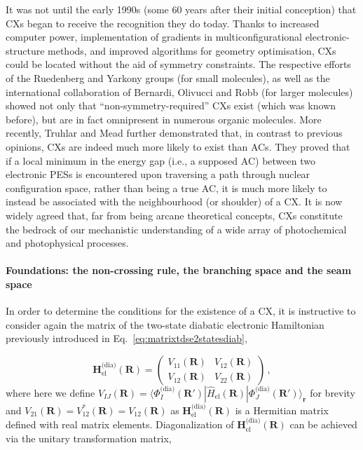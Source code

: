 \documentclass[9pt,bestpractices]{livecoms}
\newcommand{\R}{\mathbf{R}}
\newcommand{\Rprime}{\mathbf{R'}}
\newcommand{\re}{\mathbf{r}}
\begin{document}
It was not until the early 1990s (some 60 years after their initial conception) that CXs began to receive the recognition they do today.\cite{domcke_front_2004}
Thanks to increased computer power, implementation of gradients in multiconfigurational electronic-structure methods, and improved algorithms for geometry optimisation, CXs could be located without the aid of symmetry constraints.\cite{lipkowitz_conical_2007}
The respective efforts of the Ruedenberg\cite{atchity_potential_1991, xantheas_potential_1991} and Yarkony\cite{riad_manaa_noncrossing_1990} groups (for small molecules), as well as the international collaboration of Bernardi, Olivucci and Robb\cite{bernardi_mechanism_1990, bernardi_predicting_1990} (for larger molecules) showed not only that ``non-symmetry-required'' CXs exist (which was known before), but are in fact omnipresent in numerous organic molecules.\cite{domcke_role_2012} 
More recently, Truhlar and Mead\cite{truhlar_relative_2003} further demonstrated that, in contrast to previous opinions, CXs are indeed much more likely to exist than ACs. 
They proved that if a local minimum in the energy gap (i.e., a supposed AC) between two electronic PESs is encountered upon traversing a path through nuclear configuration space, rather than being a true AC, it is much more likely to instead be associated with the neighbourhood (or shoulder) of a CX. 
It is now widely agreed that, far from being arcane theoretical concepts,\cite{zhu_non-adiabaticity_2016,boeije_one-mode_2023} CXs constitute the bedrock of our mechanistic understanding of a wide array of photochemical and photophysical processes.\cite{gonzalez2012progress,domcke_role_2012,gozem2017theory,10.1039/9781782626954-00016,blancafort_photochemistry_2014,levine2019conical}

\paragraph{Foundations: the non-crossing rule, the branching space and the seam space}
\label{ch2_non-cross_branch_seam}

In order to determine the conditions for the existence of a CX, it is instructive to consider again the matrix of the two-state diabatic electronic Hamiltonian previously introduced in Eq.~\eqref{eq:matrixtdse2statesdiab},\cite{matsika_electronic_2021} 

\begin{equation}
\label{dia_elec_ham}  
    \mathbf{H}_{\text{el}}^{\text{(dia)}}(\R) =
    \begin{pmatrix}
        V_{11}(\R) & V_{12}(\R) \\
        V_{12}(\R) & V_{22}(\R)
    \end{pmatrix} \, ,
\end{equation}
where here we define $V_{IJ}(\R) = \langle \Phi_I^{\text{(dia)}}(\Rprime) | \hat{H}_{\text{el}}(\R) | \Phi_J^{\text{(dia)}}(\Rprime) \rangle_{\re}$ for brevity and $V_{21}(\R) = V^*_{12}(\R) = V_{12}(\R)$ as $\mathbf{H}_{\text{el}}^{\text{(dia)}}(\R)$ is a Hermitian matrix defined with real matrix elements.
Diagonalization of $\mathbf{H}_{\text{el}}^{\text{(dia)}}(\R)$ can be achieved via the unitary transformation matrix,
\end{document}
